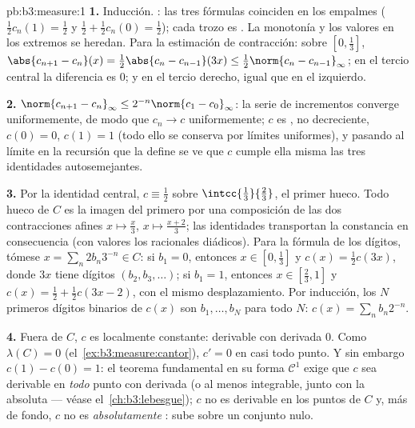 \begin{solution}{pb:b3:measure:1}
\textbf{1.} Inducción. :
las tres fórmulas coinciden en los empalmes ($\frac12c_n(1) = \frac12$ y
$\frac12 +
\frac12c_n(0) = \frac12$); cada trozo es
. La monotonía y los
valores en los extremos se heredan. Para la estimación de contracción:
sobre $[0,\frac13]$, $\abs{c_{n+1} - c_n}(x)
= \frac12\abs{c_n - c_{n-1}}(3x) \leq \frac12\norm{c_n -
c_{n-1}}_\infty$; en el tercio central la diferencia es $0$; y en el
tercio derecho, igual que en el izquierdo.

\textbf{2.} $\norm{c_{n+1} - c_n}_\infty \leq
2^{-n}\norm{c_1 - c_0}_\infty$: la serie de incrementos converge
uniformemente, de modo que $c_n \to c$ uniformemente; $c$ es
, no decreciente,
$c(0) = 0$, $c(1) = 1$ (todo ello se conserva por límites uniformes), y
pasando al límite en la recursión que la define se ve que $c$ cumple
ella misma las tres identidades autosemejantes.

\textbf{3.} Por la identidad central, $c \equiv \frac12$ sobre
$\intcc{\frac13}{\frac23}$, el primer hueco. Todo hueco de $C$ es la
imagen del primero por una composición de las dos contracciones afines
$x \mapsto \frac x3$, $x\mapsto\frac{x +
2}3$; las identidades transportan la constancia en consecuencia (con
valores los racionales diádicos). Para la fórmula de los dígitos, tómese
$x =
\sum_n 2b_n3^{-n} \in C$: si $b_1 = 0$, entonces $x \in
[0,\frac13]$ y $c(x) = \frac12c(3x)$, donde $3x$ tiene dígitos
$(b_2, b_3, \dots)$; si $b_1 = 1$, entonces $x \in [\frac23, 1]$ y
$c(x) = \frac12 + \frac12c(3x - 2)$, con el mismo desplazamiento. Por
inducción, los $N$ primeros dígitos binarios de $c(x)$ son $b_1,
\dots, b_N$ para todo $N$: $c(x) = \sum_nb_n2^{-n}$.

\textbf{4.} Fuera de $C$, $c$ es localmente constante: derivable con
derivada $0$. Como $\lambda(C) = 0$ (el~\cref{ex:b3:measure:cantor}),
$c' = 0$ en casi todo punto. Y sin embargo $c(1) - c(0) = 1$: el teorema
fundamental en su forma $\mathcal
C^1$ exige que $c$ sea derivable en \emph{todo} punto con derivada
 (o al menos integrable,
junto con la  absoluta
--- véase el~\cref{ch:b3:lebesgue}); $c$ no es derivable en los puntos
de $C$ y, más de fondo, $c$ no es \emph{absolutamente
}: sube sobre un conjunto
nulo.


\end{solution}
